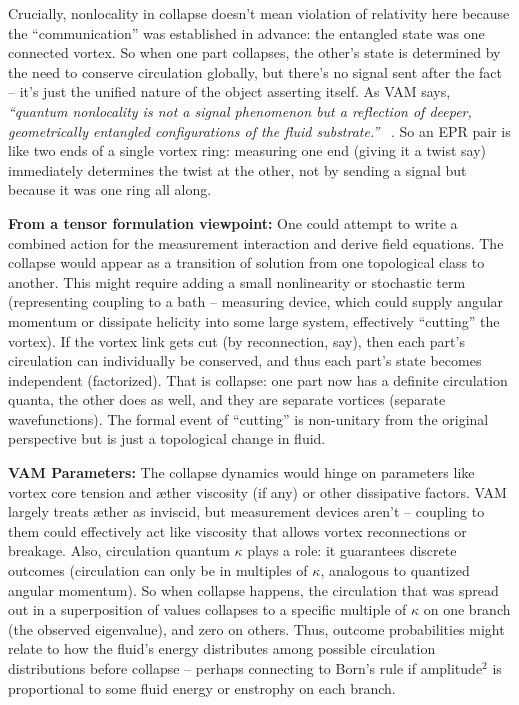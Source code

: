 \documentclass[a4paper, aps,preprint,superscriptaddress, 12pt]{revtex4}
\begin{document}
Crucially, nonlocality in collapse doesn’t mean violation of relativity here because the “communication” was established in advance: the entangled state was one connected vortex. So when one part collapses, the other’s state is determined by the need to conserve circulation globally, but there’s no signal sent after the fact – it’s just the unified nature of the object asserting itself. As VAM says, \textit{“quantum nonlocality is not a signal phenomenon but a reflection of deeper, geometrically entangled configurations of the fluid substrate.”}~\cite{Iskandarani2025c} . So an EPR pair is like two ends of a single vortex ring: measuring one end (giving it a twist say) immediately determines the twist at the other, not by sending a signal but because it was one ring all along.


\textbf{From a tensor formulation viewpoint:} One could attempt to write a combined action for the measurement interaction and derive field equations. The collapse would appear as a transition of solution from one topological class to another. This might require adding a small nonlinearity or stochastic term (representing coupling to a bath – measuring device, which could supply angular momentum or dissipate helicity into some large system, effectively “cutting” the vortex). If the vortex link gets cut (by reconnection, say), then each part’s circulation can individually be conserved, and thus each part’s state becomes independent (factorized). That is collapse: one part now has a definite circulation quanta, the other does as well, and they are separate vortices (separate wavefunctions). The formal event of “cutting” is non-unitary from the original perspective but is just a topological change in fluid.


\textbf{VAM Parameters:} The collapse dynamics would hinge on parameters like vortex core tension and æther viscosity (if any) or other dissipative factors. VAM largely treats æther as inviscid, but measurement devices aren’t – coupling to them could effectively act like viscosity that allows vortex reconnections or breakage. Also, circulation quantum $\kappa$ plays a role: it guarantees discrete outcomes (circulation can only be in multiples of $\kappa$, analogous to quantized angular momentum). So when collapse happens, the circulation that was spread out in a superposition of values collapses to a specific multiple of $\kappa$ on one branch (the observed eigenvalue), and zero on others. Thus, outcome probabilities might relate to how the fluid’s energy distributes among possible circulation distributions before collapse – perhaps connecting to Born’s rule if amplitude$^2$ is proportional to some fluid energy or enstrophy on each branch.
\end{document}

